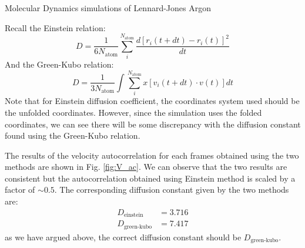 \documentclass{article}
\begin{document}
\begin{section}{Molecular Dynamics simulations of Lennard-Jones Argon}
\begin{enumerate}[1.]
	\begin{tcolorbox}[breakable]
		Recall the Einstein relation:
		$$
			D = \frac{1}{6 N_\text{atom}} \sum_i^{N_\text{atom}}
			\frac{d[r_i(t+dt) - r_i(t)]^2}{dt}
		$$
		And the Green-Kubo relation:
		$$
			D = \frac{1}{3 N_\text{atom}} \int \sum_i^{N_\text{atom}}
			x[v_i(t+dt) \cdot v(t)] dt
		$$
		Note that for Einstein diffusion coefficient, the coordinates system used should be the unfolded coordinates. However, since the simulation uses the folded coordinates, we can see there will be some discrepancy with the diffusion constant found using the Green-Kubo relation.

		The results of the velocity autocorrelation for each frames obtained using the two methods are shown in Fig. \ref{fig:V_ac}. We can observe that the two results are consistent but the autocorrelation obtained using Einstein method is scaled by a factor of $\sim 0.5$. The corresponding diffusion constant given by the two methods are:
		\begin{align*}
			D_\text{einstein}   & = 3.716 \\
			D_\text{green-kubo} & = 7.417
		\end{align*}
		as we have argued above, the correct diffusion constant should be $D_\text{green-kubo}$.


\end{tcolorbox}
\end{enumerate}
\end{section}
\end{document}
